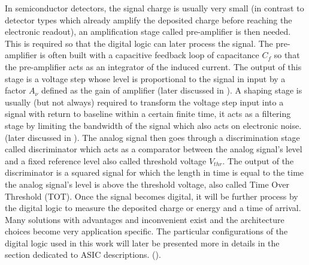 		In semiconductor detectors, the signal charge is usually very small (in contrast to detector types which already amplify the deposited charge before reaching the electronic readout), an amplification stage called pre-amplifier is then needed. This is required so that the digital logic can later process the signal. The pre-amplifier is often built with a capacitive feedback loop of capacitance $C_f$ so that the pre-amplifier acts as an integrator of the induced current. 
		The output of this stage is a voltage step whose level is proportional to the signal in input by a factor $A_\nu$ defined as the gain of amplifier (later discussed in ). A shaping stage is usually (but not always) required to transform the voltage step input into a signal with return to baseline within a certain finite time, it acts as a filtering stage by limiting the bandwidth of the signal which also acts on electronic noise. (later discussed in ). 
		The analog signal then goes through a discrimination stage called discriminator which acts as a comparator between the analog signal's level and a fixed reference level also called threshold voltage $V_{thr}$. The output of the discriminator is a squared signal for which the length in time is equal to the time the analog signal's level is above the threshold voltage, also called Time Over Threshold (TOT). Once the signal becomes digital, it will be further process by the digital logic to measure the deposited charge or energy and a time of arrival. Many solutions with advantages and inconvenient exist and the architecture choices become very application specific. The particular configurations of the digital logic used in this work will later be presented more in details in the section dedicated to ASIC descriptions. (). 
	

